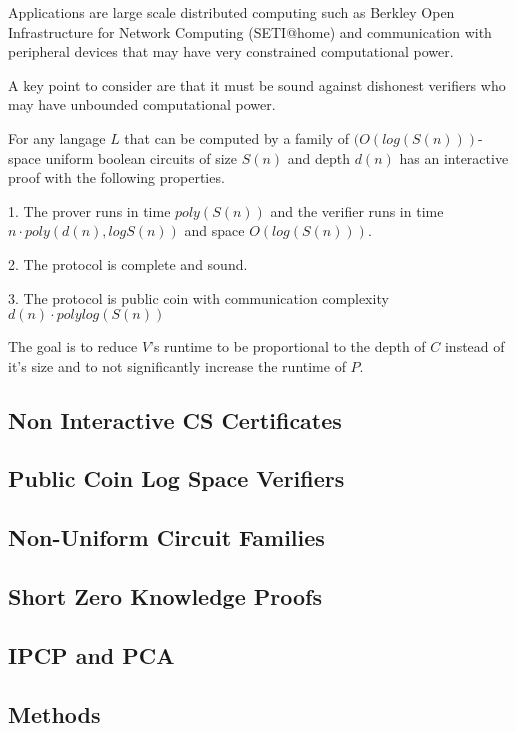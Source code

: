 \documentclass{article}
\begin{document}
Applications are large scale distributed computing such as Berkley
Open Infrastructure for Network Computing (SETI@home) and
communication with peripheral devices that may have very constrained
computational power.

A key point to consider are that it must be sound against dishonest verifiers who may have unbounded computational power.

For any langage $L$
that can be computed by a family of $(O(log(S(n)))$-space
uniform boolean circuits of size $S(n)$
and depth $d(n)$
has an interactive proof with the following properties.

1. The prover runs in time $poly(S(n))$
and the verifier runs in time $n \cdot poly(d(n), logS(n))$
and space $O(log(S(n)))$.

2. The protocol is complete and sound.

3. The protocol is public coin with communication complexity
$d(n) \cdot polylog(S(n))$

The goal is to reduce $V$'s runtime to be proportional to the depth of $C$ instead of it's size and to not significantly increase the runtime of $P$.

\subsection{Non Interactive CS Certificates}

\subsection{Public Coin Log Space Verifiers}

\subsection{Non-Uniform Circuit Families}

\subsection{Short Zero Knowledge Proofs}

\subsection{IPCP and PCA}

\subsection{Methods}
\end{document}
